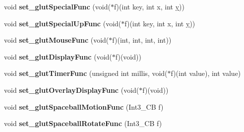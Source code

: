 \begin{DoxyCompactItemize}
\item 
\hypertarget{class_g_l_u_i___master___object_a69ccd15bd0829ef1600de7026e6e903e}{void {\bfseries set\+\_\+glut\+Special\+Func} (void($\ast$f)(int key, int x, int \hyperlink{_ice_utils_8h_aa7ffaed69623192258fb8679569ff9ba}{y}))}\label{class_g_l_u_i___master___object_a69ccd15bd0829ef1600de7026e6e903e}

\item 
\hypertarget{class_g_l_u_i___master___object_ad8d70aa3508a971da5b7ebbdc8401759}{void {\bfseries set\+\_\+glut\+Special\+Up\+Func} (void($\ast$f)(int key, int x, int \hyperlink{_ice_utils_8h_aa7ffaed69623192258fb8679569ff9ba}{y}))}\label{class_g_l_u_i___master___object_ad8d70aa3508a971da5b7ebbdc8401759}

\item 
\hypertarget{class_g_l_u_i___master___object_a8cfe4c66d1eae820db4409ea7f4cdd61}{void {\bfseries set\+\_\+glut\+Mouse\+Func} (void($\ast$f)(int, int, int, int))}\label{class_g_l_u_i___master___object_a8cfe4c66d1eae820db4409ea7f4cdd61}

\item 
\hypertarget{class_g_l_u_i___master___object_a2a20f0e78093357d1b2ca9099dccab2a}{void {\bfseries set\+\_\+glut\+Display\+Func} (void($\ast$f)(void))}\label{class_g_l_u_i___master___object_a2a20f0e78093357d1b2ca9099dccab2a}

\item 
\hypertarget{class_g_l_u_i___master___object_a57fd64245124e6d77e78b2d33b8d34b4}{void {\bfseries set\+\_\+glut\+Timer\+Func} (unsigned int millis, void($\ast$f)(int value), int value)}\label{class_g_l_u_i___master___object_a57fd64245124e6d77e78b2d33b8d34b4}

\item 
\hypertarget{class_g_l_u_i___master___object_aa36f406dc447d6903dec41d7b3a8293e}{void {\bfseries set\+\_\+glut\+Overlay\+Display\+Func} (void($\ast$f)(void))}\label{class_g_l_u_i___master___object_aa36f406dc447d6903dec41d7b3a8293e}

\item 
\hypertarget{class_g_l_u_i___master___object_acfcb50c389eb48a599ffabfa87ee91d7}{void {\bfseries set\+\_\+glut\+Spaceball\+Motion\+Func} (Int3\+\_\+\+C\+B f)}\label{class_g_l_u_i___master___object_acfcb50c389eb48a599ffabfa87ee91d7}

\item 
\hypertarget{class_g_l_u_i___master___object_a0d8211580f34f3349c4c63431220049c}{void {\bfseries set\+\_\+glut\+Spaceball\+Rotate\+Func} (Int3\+\_\+\+C\+B f)}\label{class_g_l_u_i___master___object_a0d8211580f34f3349c4c63431220049c}


\end{DoxyCompactItemize}
